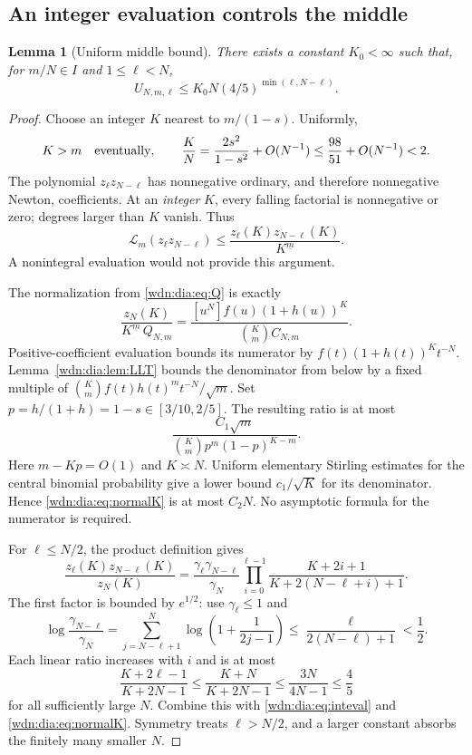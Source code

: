 \documentclass[11pt,letterpaper]{article}
\newtheorem{lemma}[theorem]{Lemma}
\theoremstyle{remark}\newtheorem{remark}[theorem]{Remark}
\newcommand{\LL}{\mathcal L}
\newcommand{\fall}[2]{#1^{\underline{#2}}}
\begin{document}
\subsection{An integer evaluation controls the middle}
\begin{lemma}[Uniform middle bound]\label{wdn:dia:lem:middle}
There exists a constant $K_0<\infty$ such that, for $m/N\in I$ and
$1\le\ell<N$,
\begin{equation}\label{wdn:dia:eq:middle}
 U_{N,m,\ell}\le K_0N(4/5)^{\min(\ell,N-\ell)}.
\end{equation}
\end{lemma}
\begin{proof}
Choose an integer $K$ nearest to $m/(1-s)$. Uniformly,
\[
 K>m\quad\hbox{eventually},\qquad
 \frac KN=\frac{2s^2}{1-s^2}+O(N^{-1})\le\frac{98}{51}+O(N^{-1})<2.
\]
The polynomial $z_\ell z_{N-\ell}$ has nonnegative ordinary, and therefore
nonnegative Newton, coefficients. At an \emph{integer} $K$, every falling
factorial is nonnegative or zero; degrees larger than $K$ vanish. Thus
\begin{equation}\label{wdn:dia:eq:inteval}
 \LL_m(z_\ell z_{N-\ell})
 \le\frac{z_\ell(K)z_{N-\ell}(K)}{\fall K m}.
\end{equation}
A nonintegral evaluation would not provide this argument.

The normalization from \eqref{wdn:dia:eq:Q} is exactly
\begin{equation}\label{wdn:dia:eq:normalK}
 \frac{z_N(K)}{\fall K m\,Q_{N,m}}
 =\frac{[u^N]f(u)(1+h(u))^K}{\binom Km C_{N,m}}.
\end{equation}
Positive-coefficient evaluation bounds its numerator by
$f(t)(1+h(t))^Kt^{-N}$. Lemma~\ref{wdn:dia:lem:LLT} bounds the denominator from
below by a fixed multiple of
$\binom Km f(t)h(t)^mt^{-N}/\sqrt m$. Set
$p=h/(1+h)=1-s\in[3/10,2/5]$. The resulting ratio is at most
\[
 \frac{C_1\sqrt m}{\binom Km p^m(1-p)^{K-m}}.
\]
Here $m-Kp=O(1)$ and $K\asymp N$. Uniform elementary Stirling estimates for
the central binomial probability give a lower bound $c_1/\sqrt K$ for its
denominator. Hence \eqref{wdn:dia:eq:normalK} is at most $C_2N$. No asymptotic
formula for the numerator is required.

For $\ell\le N/2$, the product definition gives
\begin{equation}\label{wdn:dia:eq:productratio}
 \frac{z_\ell(K)z_{N-\ell}(K)}{z_N(K)}
 =\frac{\gamma_\ell\gamma_{N-\ell}}{\gamma_N}
 \prod_{i=0}^{\ell-1}
 \frac{K+2i+1}{K+2(N-\ell+i)+1}.
\end{equation}
The first factor is bounded by $e^{1/2}$: use $\gamma_\ell\le1$ and
\[
 \log\frac{\gamma_{N-\ell}}{\gamma_N}
 =\sum_{j=N-\ell+1}^N\log\left(1+\frac1{2j-1}\right)
 \le\frac\ell{2(N-\ell)+1}<\frac12.
\]
Each linear ratio increases with $i$ and is at most
\[
 \frac{K+2\ell-1}{K+2N-1}\le\frac{K+N}{K+2N-1}
 \le\frac{3N}{4N-1}\le\frac45
\]
for all sufficiently large $N$. Combine this with \eqref{wdn:dia:eq:inteval} and
\eqref{wdn:dia:eq:normalK}. Symmetry treats $\ell>N/2$, and a larger constant absorbs
the finitely many smaller $N$.
\end{proof}
\end{document}
